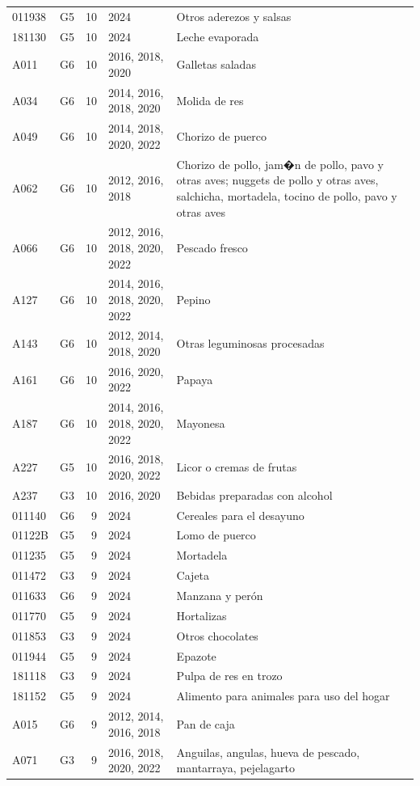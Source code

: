 \begin{table}[ht]
\begin{tabular}{llrll}
  011938 & G5 &  10 & 2024 & Otros aderezos y salsas \\ 
  181130 & G5 &  10 & 2024 & Leche evaporada \\ 
  A011 & G6 &  10 & 2016, 2018, 2020 & Galletas saladas \\ 
  A034 & G6 &  10 & 2014, 2016, 2018, 2020 & Molida de res \\ 
  A049 & G6 &  10 & 2014, 2018, 2020, 2022 & Chorizo de puerco \\ 
  A062 & G6 &  10 & 2012, 2016, 2018 & Chorizo de pollo, jam�n de pollo, pavo y otras aves; nuggets de pollo y otras aves, salchicha, mortadela, tocino de pollo, pavo y otras aves \\ 
  A066 & G6 &  10 & 2012, 2016, 2018, 2020, 2022 & Pescado fresco \\ 
  A127 & G6 &  10 & 2014, 2016, 2018, 2020, 2022 & Pepino \\ 
  A143 & G6 &  10 & 2012, 2014, 2018, 2020 & Otras leguminosas procesadas \\ 
  A161 & G6 &  10 & 2016, 2020, 2022 & Papaya \\ 
  A187 & G6 &  10 & 2014, 2016, 2018, 2020, 2022 & Mayonesa \\ 
  A227 & G5 &  10 & 2016, 2018, 2020, 2022 & Licor o cremas de frutas \\ 
  A237 & G3 &  10 & 2016, 2020 & Bebidas preparadas con alcohol \\ 
  011140 & G6 &   9 & 2024 & Cereales para el desayuno \\ 
  01122B & G5 &   9 & 2024 & Lomo de puerco \\ 
  011235 & G5 &   9 & 2024 & Mortadela \\ 
  011472 & G3 &   9 & 2024 & Cajeta \\ 
  011633 & G6 &   9 & 2024 & Manzana y perón \\ 
  011770 & G5 &   9 & 2024 & Hortalizas \\ 
  011853 & G3 &   9 & 2024 & Otros chocolates \\ 
  011944 & G5 &   9 & 2024 & Epazote \\ 
  181118 & G3 &   9 & 2024 & Pulpa de res en trozo \\ 
  181152 & G5 &   9 & 2024 & Alimento para animales para uso del hogar \\ 
  A015 & G6 &   9 & 2012, 2014, 2016, 2018 & Pan de caja \\ 
  A071 & G3 &   9 & 2016, 2018, 2020, 2022 & Anguilas, angulas, hueva de pescado, mantarraya, pejelagarto \\ 

\end{tabular}
\end{table}
